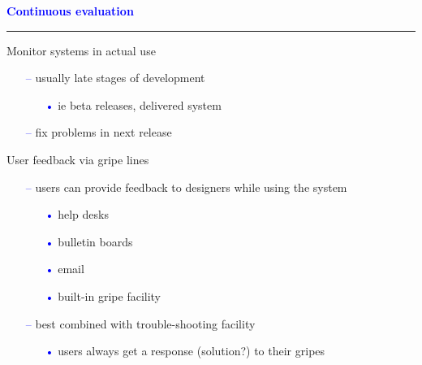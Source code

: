 \documentclass[pdf]{beamer}
\begin{document}
{{{{{{{{{{\begin{frame}
\end{frame}



{
\begin{frame}
	\vspace{8mm}
	\textcolor{Blue}{\textbf{\large{Continuous evaluation}}}
    \textcolor{red}{\rule{10cm}{1mm}}
    
    {\LARGE Monitor systems in actual use}
    \begin{itemize}
      \item[\textcolor{Blue}{--}] usually late stages of development 
        \begin{itemize}
          \item[\textcolor{Blue}{•}] ie beta releases, delivered system
        \end{itemize}
      \item[\textcolor{Blue}{--}] fix problems in next release
    \end{itemize}
    \vspace{8mm}
    {\LARGE User feedback via gripe lines}
    \begin{itemize}
      \item[\textcolor{Blue}{--}] users can provide feedback to designers while using the system
      \begin{itemize}
        \item[\textcolor{Blue}{•}] help desks
        \item[\textcolor{Blue}{•}] bulletin boards
        \item[\textcolor{Blue}{•}] email
        \item[\textcolor{Blue}{•}] built-in gripe facility
      \end{itemize}
    \end{itemize}
	\vspace{3mm}
	\begin{itemize}
      \item[\textcolor{Blue}{--}] best combined with trouble-shooting facility
        \begin{itemize}
          \item[\textcolor{Blue}{•}] users always get a response (solution?) to their gripes
        \end{itemize}
    \end{itemize}
\end{frame}



}}}}}}}}}}}
\end{document}
